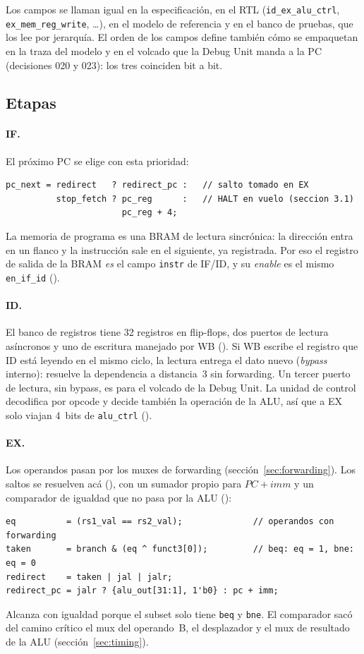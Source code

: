 Los campos se llaman igual en la especificación, en el RTL (\texttt{id\_ex\_alu\_ctrl},
\texttt{ex\_mem\_reg\_write}, \ldots), en el modelo de referencia y en el banco de pruebas, que los
lee por jerarquía. El orden de los campos define también cómo se empaquetan en la traza del
modelo y en el volcado que la Debug Unit manda a la PC (decisiones 020 y 023): los tres
coinciden bit a bit.

\subsection{Etapas}

\paragraph{IF.} El próximo PC se elige con esta prioridad:
\begin{lstlisting}[style=verilog,numbers=none]
pc_next = redirect   ? redirect_pc :   // salto tomado en EX
          stop_fetch ? pc_reg      :   // HALT en vuelo (seccion 3.1)
                       pc_reg + 4;
\end{lstlisting}
La memoria de programa es una BRAM de lectura sincrónica: la dirección entra en un flanco y la
instrucción sale en el siguiente, ya registrada. Por eso el registro de salida de la BRAM
\emph{es} el campo \texttt{instr} de IF/ID, y su \emph{enable} es el mismo \texttt{en\_if\_id}
().

\paragraph{ID.} El banco de registros tiene 32 registros en flip-flops, dos puertos de lectura
asíncronos y uno de escritura manejado por WB (). Si WB escribe el registro que ID
está leyendo en el mismo ciclo, la lectura entrega el dato nuevo (\emph{bypass} interno): resuelve
la dependencia a distancia~3 sin forwarding. Un tercer puerto de lectura, sin bypass, es para el
volcado de la Debug Unit. La unidad de control decodifica por opcode y decide también la operación
de la ALU, así que a EX solo viajan 4~bits de \texttt{alu\_ctrl} ().

\paragraph{EX.} Los operandos pasan por los muxes de forwarding (sección~\ref{sec:forwarding}).
Los saltos se resuelven acá (), con un sumador propio para $PC + imm$ y un
comparador de igualdad que no pasa por la ALU ():
\begin{lstlisting}[style=verilog,numbers=none]
eq          = (rs1_val == rs2_val);              // operandos con forwarding
taken       = branch & (eq ^ funct3[0]);         // beq: eq = 1, bne: eq = 0
redirect    = taken | jal | jalr;
redirect_pc = jalr ? {alu_out[31:1], 1'b0} : pc + imm;
\end{lstlisting}
Alcanza con igualdad porque el subset solo tiene \texttt{beq} y \texttt{bne}. El comparador sacó
del camino crítico el mux del operando~B, el desplazador y el mux de resultado de la ALU
(sección~\ref{sec:timing}).

